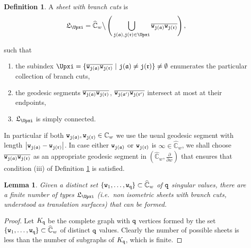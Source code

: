 \documentclass[final,3p,times]{elsarticle}
\newcommand{\CC}{\ensuremath{{\mathbb C}}}
\newcommand{\CW}{\ensuremath{{\widehat{\mathbb C}}}}
\newcommand{\abs}[1]{\left\lvert#1\right\rvert}
\newcommand{\del}[2]{\frac{\partial #1}{\partial #2}}
\newcommand{\msigma}{\ensuremath{{\mathfrak{a}}}}
\newcommand{\mrho}{\ensuremath{{\mathfrak{r}}}}
\newtheorem{lemma}[theorem]{Lemma}
\theoremstyle{definition}
\newtheorem{definition}[theorem]{Definition}
\begin{document}
\begin{definition}
\label{def:sheet-branchcut}
A \emph{sheet with branch cuts} is 
\begin{equation}
\label{eq:sheet}
\mathfrak{L}_\Upxi = 
\CW_w \big\backslash \, 
\Bigg(\bigcup\limits_{
{\tt j}( \msigma ) , {\tt j}( \mrho ) \in  \Upxi } 
\overline{ {\tt w}_{{\tt j}( \msigma )} 
{\tt w}_{{\tt j}( \mrho )} } \Bigg)  \, ,
\end{equation}

\noindent 
such that 

\begin{enumerate}[label=\roman*),leftmargin=*] 
\item
the subindex
$\Upxi=\{
\overline{ {\tt w}_{{\tt j}( \msigma )} 
{\tt w}_{{\tt j}( \mrho )} } 
\ \vert \
{\tt j}( \msigma ) \neq {\tt j}( \mrho )
\} 
\neq \emptyset$ 
enumerates the particular collection of branch cuts,

\item
the geodesic segments
$\overline{ {\tt w}_{{\tt j}( \msigma )} {\tt w}_{{\tt j}( \mrho )} }$,
$\overline{ {\tt w}_{{\tt j}( \msigma^\prime )} {\tt w}_{{\tt j}( \mrho^\prime )} }$ 
intersect at most at their endpoints,

\item
$\mathfrak{L}_\Upxi$ is simply connected.
\end{enumerate}
\end{definition}



In particular if both ${\tt w}_{{\tt j}( \msigma )}, {\tt w}_{{\tt j}( \mrho )} \in\CC_w$ we use the usual geodesic segment with length
$\abs{ {\tt w}_{{\tt j}( \msigma )} - {\tt w}_{{\tt j}( \mrho )} }$.
In case either 
${\tt w}_{{\tt j}( \msigma )}$ or ${\tt w}_{{\tt j}( \mrho )}$ is $\infty\in\CW_w$, 
we shall choose $\overline{ {\tt w}_{{\tt j}( \msigma )} {\tt w}_{{\tt j}( \mrho )} }$ 
as an appropriate geodesic segment in
$(\CW_w, \del{}{w})$ that ensures that condition (iii) of Definition \ref{def:sheet-branchcut} is satisfied.



\begin{lemma}
Given a distinct set $\{{\tt w}_1,\ldots,{\tt w}_{\tt q} \}\subset\CW_w$ of ${\tt q}$ singular values, 
there are a finite number of \emph{types} $\mathfrak{L}_\Upxi$
(\emph{i.e.}\ non isometric sheets with branch cuts, 
understood as translation surfaces) 
that can be formed.
\end{lemma}

\begin{proof}
Let $K_{\tt q}$ be the complete graph with $\tt q$ vertices formed by the set $\{{\tt w}_1,\ldots,{\tt w}_{\tt q} \}\subset\CW_w$ of distinct $\tt q$ values.
Clearly the number of possible sheets is less than the number of subgraphs of $K_{\tt q}$, which is finite.
\end{proof}
\end{document}
